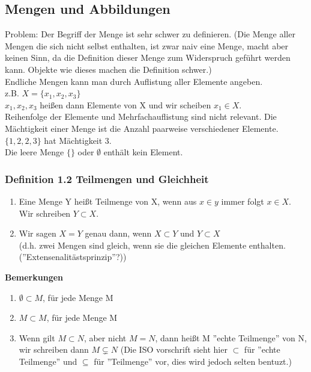 \documentclass{report}
\theoremstyle{customrem}
\theoremstyle{customdef}
\begin{document}
\subsection{Mengen und Abbildungen}
Problem: Der Begriff der Menge ist sehr schwer zu definieren. (Die Menge aller Mengen die sich nicht selbst enthalten, ist zwar naiv eine Menge, macht aber keinen Sinn, da die Definition dieser Menge zum Widerspruch geführt werden kann. Objekte wie dieses machen die Definition schwer.)\\
Endliche Mengen kann man durch Auflistung aller Elemente angeben.\\
z.B. $X = \{x_1, x_2, x_3\}$\\
$x_1, x_2, x_3$ hei\ss{}en dann Elemente von X und wir scheiben $x_1 \in X$.\\
Reihenfolge der Elemente und Mehrfachauflistung sind nicht relevant. Die Mächtigkeit einer Menge ist die Anzahl paarweise verschiedener Elemente.\\
$\{1, 2, 2, 3\}$ hat Mächtigkeit 3.\\
Die leere Menge $\{\}$ oder $\emptyset$ enthält kein Element.

\subsubsection{Definition 1.2 Teilmengen und Gleichheit}
\begin{enumerate}
\item{Eine Menge Y hei\ss{}t Teilmenge von X, wenn aus $x \in y$ immer folgt $x \in X$. Wir schreiben $Y \subset X$.}
\item{Wir sagen $X=Y$ genau dann, wenn $X \subset Y$ und $Y \subset X$\\
(d.h. zwei Mengen sind gleich, wenn sie die gleichen Elemente enthalten. (''Extensenalitästsprinzip''?))}
\end{enumerate}
\textbf{Bemerkungen}
\begin{enumerate}
\item{$\emptyset \subset M$, für jede Menge M}
\item{$M \subset M$, für jede Menge M}
\item{Wenn gilt $M \subset N$, aber nicht $M = N$, dann hei\ss{}t M ''echte Teilmenge'' von N, wir schreiben dann $M \subsetneq N$ (Die ISO vorschrift sieht hier $\subset$ für ''echte Teilmenge'' und $\subseteq$ für ''Teilmenge'' vor, dies wird jedoch selten bentuzt.)}
\end{enumerate}
\end{document}
